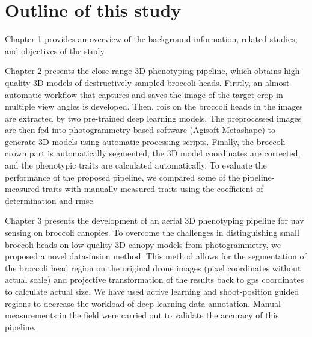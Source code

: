 \section{Outline of this study}

Chapter 1 provides an overview of the background information, related studies, and objectives of the study.

Chapter 2 presents the close-range 3D phenotyping pipeline, which obtains high-quality 3D models of destructively sampled broccoli heads. Firstly, an almost-automatic workflow that captures and saves the image of the target crop in multiple view angles is developed. Then, \gls{roi}s on the broccoli heads in the images are extracted by two pre-trained deep learning models. The preprocessed images are then fed into photogrammetry-based software (Agisoft Metashape) to generate 3D models using automatic processing scripts. Finally, the broccoli crown part is automatically segmented, the 3D model coordinates are corrected, and the phenotypic traits are calculated automatically. To evaluate the performance of the proposed pipeline, we compared some of the pipeline-measured traits with manually measured traits using the coefficient of determination and \gls{rmse}.


Chapter 3 presents the development of an aerial 3D phenotyping pipeline for \gls{uav} sensing on broccoli canopies. To overcome the challenges in distinguishing small broccoli heads on low-quality 3D canopy models from photogrammetry, we proposed a novel data-fusion method. This method allows for the segmentation of the broccoli head region on the original drone images (pixel coordinates without actual scale) and projective transformation of the results back to \gls{gps} coordinates to calculate actual size. We have used active learning and shoot-position guided regions to decrease the workload of deep learning data annotation. Manual measurements in the field were carried out to validate the accuracy of this pipeline.

